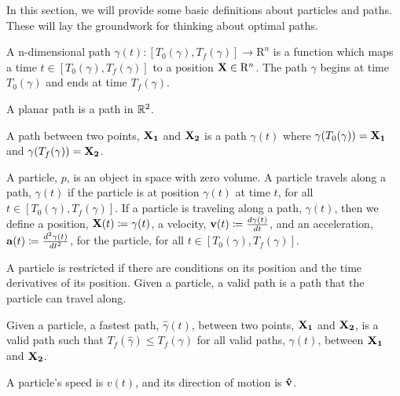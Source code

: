 In this section, we will provide some basic definitions about particles and paths. These will lay the groundwork for thinking about optimal paths.

\begin{definition}
  A n-dimensional path $\gamma(t): [T_0(\gamma), T_f(\gamma)] \to \mathrm{R}^n$ is a function which maps a time $t \in [T_0(\gamma), T_f(\gamma)]$ to a position $\mathbf{X} \in \mathrm{R}^n$. The path $\gamma$ begins at time $T_0(\gamma)$ and ends at time $T_f(\gamma)$.
\end{definition}

\begin{definition}
  A planar path is a path in $\mathbb R^2$.
\end{definition}

\begin{definition}
  A path between two points, $\mathbf{X_1}$ and $\mathbf{X_2}$ is a path $\gamma(t)$ where $\gamma(T_0(\gamma)) = \mathbf{X_1}$ and $\gamma(T_f(\gamma)) = \mathbf{X_2}$.
\end{definition}

\begin{definition}
  A particle, $p$, is an object in space with zero volume. A particle travels along a path, $\gamma(t)$ if the particle is at position $\gamma(t)$ at time $t$, for all $t \in [T_0(\gamma), T_f(\gamma)]$. If a particle is traveling along a path, $\gamma(t)$, then we define a position, $\mathbf{X}(t) \coloneqq \gamma(t)$, a velocity, $\mathbf{v}(t) \coloneqq \frac{d\gamma(t)}{dt}$, and an acceleration, $\mathbf{a}(t) \coloneqq \frac{d^2\gamma(t)}{dt^2}$, for the particle, for all $t \in [T_0(\gamma), T_f(\gamma)]$.

  A particle is restricted if there are conditions on its position and the time derivatives of its position. Given a particle, a valid path is a path that the particle can travel along.
\end{definition}

\begin{definition}
  Given a particle, a fastest path, $\hat{\gamma}(t)$, between two points, $\mathbf{X_1}$ and $\mathbf{X_2}$, is a valid path such that $T_f(\hat{\gamma}) \leq T_f(\gamma)$ for all valid paths, $\gamma(t)$, between $\mathbf{X_1}$ and $\mathbf{X_2}$.
\end{definition}

\begin{definition}
  A particle's speed is $v(t)$, and its direction of motion is $\mathbf{\hat{v}}$.
\end{definition}

